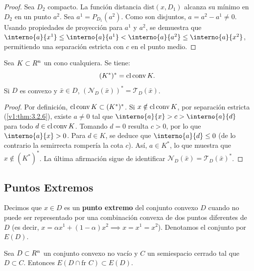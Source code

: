 \begin{proof}
 Sea $D_2$ compacto. La función distancia $\text{dist}(x, D_1)$ alcanza su mínimo en $D_2$ en un punto $a^2$. Sea $a^1 = P_{D_1}(a^2)$. Como son disjuntos, $a = a^2 - a^1 \neq 0$. Usando propiedades de proyección para $a^1$ y $a^2$, se demuestra que $\interno{a}{x^1} \leq \interno{a}{a^1} < \interno{a}{a^2} \leq \interno{a}{x^2}$, permitiendo una separación estricta con $c$ en el punto medio.
\end{proof}

\begin{proposition}\label{v1:prop:3.2.9}
 Sea $K \subset R^n$ un cono cualquiera. Se tiene:
 \[
 (K^*)^* = \operatorname{cl} \operatorname{conv} K.
 \]
 Si $D$ es convexo y $\bar{x} \in D$, $(\mathcal{N}_D(\bar{x}))^* = \mathcal{T}_D(\bar{x})$.
\end{proposition}

\begin{proof}
 Por definición, $\operatorname{cl} \operatorname{conv} K \subset (K^*)^*$. Si $x \notin \operatorname{cl} \operatorname{conv} K$, por separación estricta (\cref{v1:thm:3.2.6}), existe $a \neq 0$ tal que $\interno{a}{x} > c > \interno{a}{d}$ para todo $d \in \operatorname{cl} \operatorname{conv} K$. Tomando $d=0$ resulta $c>0$, por lo que $\interno{a}{x} > 0$. Para $d \in K$, se deduce que $\interno{a}{d} \le 0$ (de lo contrario la semirrecta rompería la cota $c$). Así, $a \in K^*$, lo que muestra que $x \notin (K^*)^*$. La última afirmación sigue de identificar $\mathcal{N}_D(\bar{x}) = \mathcal{T}_D(\bar{x})^*$.
\end{proof}

\subsection{Puntos Extremos}

\begin{definition}\label{v1:def:3.2.7}
 Decimos que $x \in D$ es un \textbf{punto extremo} del conjunto convexo $D$ cuando no puede ser representado por una combinación convexa de dos puntos diferentes de $D$ (es decir, $x = \alpha x^1 + (1-\alpha)x^2 \implies x=x^1=x^2$). Denotamos el conjunto por $E(D)$.
\end{definition}

\begin{lemma}\label{v1:lem:3.2.4}
 Sea $D \subset R^n$ un conjunto convexo no vacío y $C$ un semiespacio cerrado tal que $D \subset C$. Entonces $E(D \cap \text{fr } C) \subset E(D)$.
\end{lemma}


